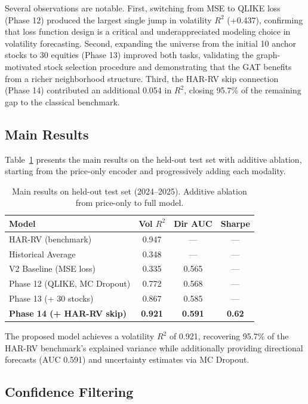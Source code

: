 \documentclass[12pt, a4paper]{article}
\begin{document}
Several observations are notable. First, switching from MSE to QLIKE loss (Phase 12) produced the largest single jump in volatility $R^2$ (+0.437), confirming that loss function design is a critical and underappreciated modeling choice in volatility forecasting. Second, expanding the universe from the initial 10 anchor stocks to 30 equities (Phase 13) improved both tasks, validating the graph-motivated stock selection procedure and demonstrating that the GAT benefits from a richer neighborhood structure. Third, the HAR-RV skip connection (Phase 14) contributed an additional 0.054 in $R^2$, closing 95.7\% of the remaining gap to the classical benchmark.

\subsection{Main Results}

Table~\ref{tab:main} presents the main results on the held-out test set with additive ablation, starting from the price-only encoder and progressively adding each modality.

\begin{table}[H]
\centering
\caption{Main results on held-out test set (2024--2025). Additive ablation from price-only to full model.}
\label{tab:main}
\begin{tabular}{lccc}
\toprule
\textbf{Model} & \textbf{Vol $R^2$} & \textbf{Dir AUC} & \textbf{Sharpe} \\
\midrule
HAR-RV (benchmark)            & 0.947 & ---   & ---  \\
Historical Average            & 0.348 & ---   & ---  \\
\midrule
V2 Baseline (MSE loss)        & 0.335 & 0.565 & ---  \\
Phase 12 (QLIKE, MC Dropout)  & 0.772 & 0.568 & ---  \\
Phase 13 (+ 30 stocks)        & 0.867 & 0.585 & ---  \\
\textbf{Phase 14 (+ HAR-RV skip)} & \textbf{0.921} & \textbf{0.591} & \textbf{0.62} \\
\bottomrule
\end{tabular}
\end{table}

The proposed model achieves a volatility $R^2$ of 0.921, recovering 95.7\% of the HAR-RV benchmark's explained variance while additionally providing directional forecasts (AUC 0.591) and uncertainty estimates via MC Dropout.

\subsection{Confidence Filtering}
\end{document}
